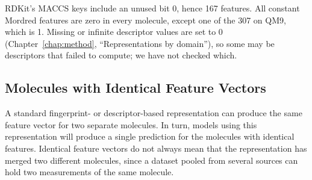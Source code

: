 RDKit's MACCS keys include an unused bit 0, hence 167 features. All constant Mordred features are zero in every molecule, except one of the 307 on QM9, which is 1. Missing or infinite descriptor values are set to 0 (Chapter~\ref{chap:method}, ``Representations by domain''), so some may be descriptors that failed to compute; we have not checked which.




\subsection{Molecules with Identical Feature Vectors}

A standard fingerprint- or descriptor-based representation can produce the same feature vector for two separate molecules. In turn, models using this representation will produce a single prediction for the molecules with identical features. Identical feature vectors do not always mean that the representation has merged two different molecules, since a dataset pooled from several sources can hold two measurements of the same molecule.


